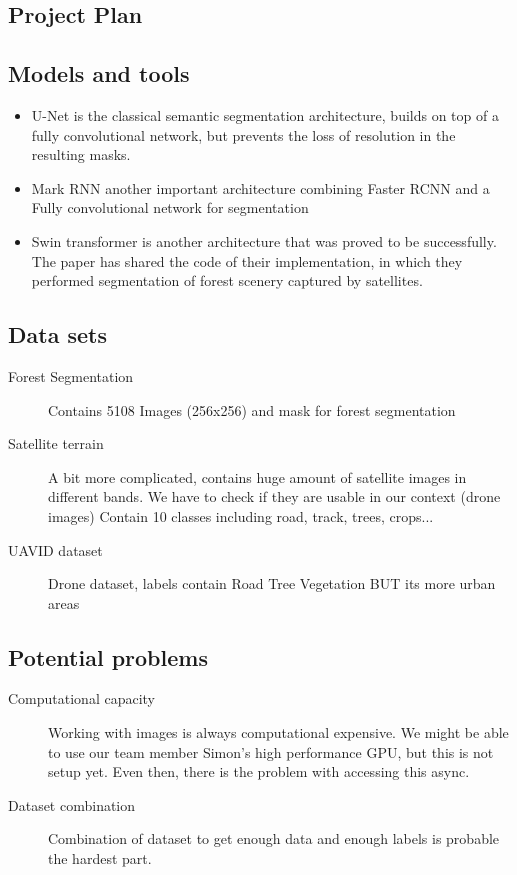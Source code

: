 \documentclass[rnd]{mas_proposal}
\begin{document}
\subsection{Project Plan}

    \subsection{Models and tools}
    \begin{itemize}
        \item U-Net is the classical semantic segmentation architecture, builds on top of a fully convolutional network, but prevents the loss of resolution in the resulting masks.\cite{umar2021forest}
        \item Mark RNN another important architecture combining Faster RCNN and a Fully convolutional network for segmentation 
        \item Swin transformer is another architecture that was proved to be successfully. The paper \cite{guerin2021satellite} has shared the code of their implementation, in which they performed segmentation of forest scenery captured by satellites.
        \end{itemize}

   
    \subsection{Data sets}
    \begin{description}
        \item[Forest Segmentation] Contains 5108 Images (256x256) and mask for forest segmentation
        \item[Satellite terrain] A bit more complicated, contains huge amount of satellite images in different bands. We have to check if they are usable in our context (drone images) Contain 10 classes including road, track, trees, crops...
        \item[UAVID dataset] Drone dataset, labels contain Road Tree Vegetation BUT its more urban areas
    \end{description}

    \subsection{Potential problems}
    \begin{description}
        \item[Computational capacity] Working with images is always computational expensive. We might be able to use our team member Simon's high performance GPU, but this is not setup yet. Even then, there is the problem with accessing this async.
        \item[Dataset combination] Combination of dataset to get enough data and enough labels is probable the hardest part.
    \end{description}
    





 
\end{document}
